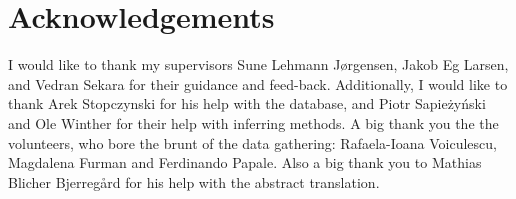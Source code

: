 \chapter{Acknowledgements}

I would like to thank my supervisors Sune Lehmann Jørgensen, Jakob Eg Larsen, and Vedran Sekara for their guidance and feed-back. Additionally, I would like to thank Arek Stopczynski for his help with the database, and Piotr Sapieżyński and Ole Winther for their help with inferring methods. A big thank you the the volunteers, who bore the brunt of the data gathering: Rafaela-Ioana Voiculescu, Magdalena Furman and Ferdinando Papale. Also a big thank you to Mathias Blicher Bjerregård for his help with the abstract translation.

